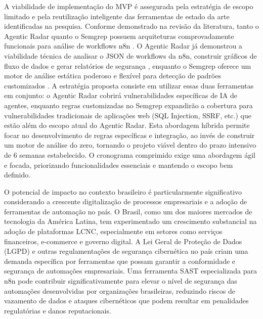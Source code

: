 \documentclass{sftex}
\begin{document}
A viabilidade de implementação do MVP é assegurada pela estratégia de escopo limitado e pela reutilização inteligente das ferramentas de estado da arte identificadas na pesquisa. Conforme demonstrado na revisão da literatura, tanto o Agentic Radar quanto o Semgrep possuem arquiteturas comprovadamente funcionais para análise de workflows n8n \cite{splxai_n8n_scanning}. O Agentic Radar já demonstrou a viabilidade técnica de analisar o JSON de workflows da n8n, construir gráficos de fluxo de dados e gerar relatórios de segurança \cite{splxai_medium_scanning}, enquanto o Semgrep oferece um motor de análise estática poderoso e flexível para detecção de padrões customizados \cite{semgrep_platform}. A estratégia proposta consiste em utilizar essas duas ferramentas em conjunto: o Agentic Radar cobrirá vulnerabilidades específicas de IA de agentes, enquanto regras customizadas no Semgrep expandirão a cobertura para vulnerabilidades tradicionais de aplicações web (SQL Injection, SSRF, etc.) que estão além do escopo atual do Agentic Radar. Esta abordagem híbrida permite focar no desenvolvimento de regras específicas e integração, ao invés de construir um motor de análise do zero, tornando o projeto viável dentro do prazo intensivo de 6 semanas estabelecido. O cronograma comprimido exige uma abordagem ágil e focada, priorizando funcionalidades essenciais e mantendo o escopo bem definido.

O potencial de impacto no contexto brasileiro é particularmente significativo considerando a crescente digitalização de processos empresariais e a adoção de ferramentas de automação no país. O Brasil, como um dos maiores mercados de tecnologia da América Latina, tem experimentado um crescimento substancial na adoção de plataformas LCNC, especialmente em setores como serviços financeiros, e-commerce e governo digital. A Lei Geral de Proteção de Dados (LGPD) e outras regulamentações de segurança cibernética no país criam uma demanda específica por ferramentas que possam garantir a conformidade e segurança de automações empresariais. Uma ferramenta SAST especializada para n8n pode contribuir significativamente para elevar o nível de segurança das automações desenvolvidas por organizações brasileiras, reduzindo riscos de vazamento de dados e ataques cibernéticos que podem resultar em penalidades regulatórias e danos reputacionais.
\end{document}
